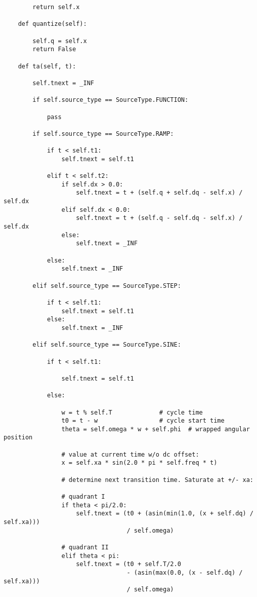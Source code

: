 \begin{lstlisting}
        return self.x

    def quantize(self):

        self.q = self.x
        return False

    def ta(self, t):

        self.tnext = _INF

        if self.source_type == SourceType.FUNCTION:

            pass

        if self.source_type == SourceType.RAMP:

            if t < self.t1:
                self.tnext = self.t1

            elif t < self.t2:
                if self.dx > 0.0:
                    self.tnext = t + (self.q + self.dq - self.x) / self.dx
                elif self.dx < 0.0:
                    self.tnext = t + (self.q - self.dq - self.x) / self.dx
                else:
                    self.tnext = _INF

            else:
                self.tnext = _INF

        elif self.source_type == SourceType.STEP:

            if t < self.t1:
                self.tnext = self.t1
            else:
                self.tnext = _INF

        elif self.source_type == SourceType.SINE:

            if t < self.t1:

                self.tnext = self.t1

            else:

                w = t % self.T             # cycle time
                t0 = t - w                 # cycle start time
                theta = self.omega * w + self.phi  # wrapped angular position

                # value at current time w/o dc offset:
                x = self.xa * sin(2.0 * pi * self.freq * t)

                # determine next transition time. Saturate at +/- xa:

                # quadrant I
                if theta < pi/2.0:
                    self.tnext = (t0 + (asin(min(1.0, (x + self.dq) / self.xa)))
                                  / self.omega)

                # quadrant II
                elif theta < pi:
                    self.tnext = (t0 + self.T/2.0
                                  - (asin(max(0.0, (x - self.dq) / self.xa)))
                                  / self.omega)


\end{lstlisting}
